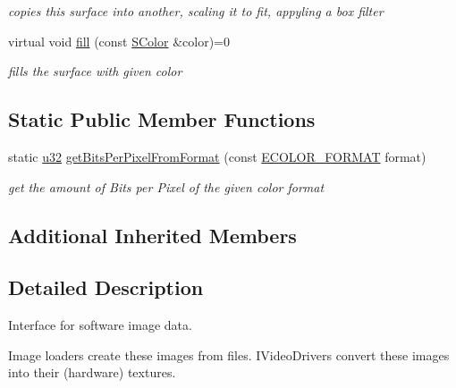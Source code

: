 \begin{DoxyCompactItemize}
\begin{DoxyCompactList}\small\item\em copies this surface into another, scaling it to fit, appyling a box filter \end{DoxyCompactList}\item 
virtual void \hyperlink{classirr_1_1video_1_1IImage_a04973e101790130f611c4c6790e5b352}{fill} (const \hyperlink{classirr_1_1video_1_1SColor}{S\+Color} \&color)=0\hypertarget{classirr_1_1video_1_1IImage_a04973e101790130f611c4c6790e5b352}{}\label{classirr_1_1video_1_1IImage_a04973e101790130f611c4c6790e5b352}

\begin{DoxyCompactList}\small\item\em fills the surface with given color \end{DoxyCompactList}\end{DoxyCompactItemize}
\subsection*{Static Public Member Functions}
\begin{DoxyCompactItemize}
\item 
static \hyperlink{namespaceirr_a0416a53257075833e7002efd0a18e804}{u32} \hyperlink{classirr_1_1video_1_1IImage_a70b50ef1bbb6f90ec4c43a91f521c2b6}{get\+Bits\+Per\+Pixel\+From\+Format} (const \hyperlink{namespaceirr_1_1video_a1d5e487888c32b1674a8f75116d829ed}{E\+C\+O\+L\+O\+R\+\_\+\+F\+O\+R\+M\+AT} format)\hypertarget{classirr_1_1video_1_1IImage_a70b50ef1bbb6f90ec4c43a91f521c2b6}{}\label{classirr_1_1video_1_1IImage_a70b50ef1bbb6f90ec4c43a91f521c2b6}

\begin{DoxyCompactList}\small\item\em get the amount of Bits per Pixel of the given color format \end{DoxyCompactList}\end{DoxyCompactItemize}
\subsection*{Additional Inherited Members}


\subsection{Detailed Description}
Interface for software image data. 

Image loaders create these images from files. I\+Video\+Drivers convert these images into their (hardware) textures. 

